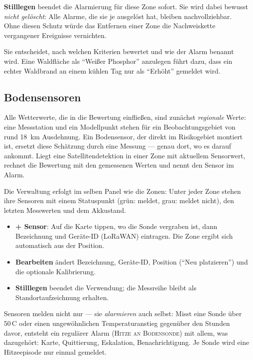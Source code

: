 \documentclass[11pt,a4paper,DIV=12,parskip=half]{scrartcl}
\begin{document}
\textbf{Stilllegen} beendet die Alarmierung für diese Zone sofort. Sie wird
dabei bewusst \emph{nicht gelöscht}: Alle Alarme, die sie je ausgelöst hat,
bleiben nachvollziehbar. Ohne diesen Schutz würde das Entfernen einer Zone die
Nachweiskette vergangener Ereignisse vernichten.

\begin{hinweis}
Sie entscheidet, nach welchen Kriterien bewertet und wie der Alarm benannt
wird. Eine Waldfläche als \enquote{Weißer Phosphor} anzulegen führt dazu, dass
ein echter Waldbrand an einem kühlen Tag nur als \enquote{Erhöht} gemeldet
wird.
\end{hinweis}

\subsection{Bodensensoren}\label{sec:sensoren}

Alle Wetterwerte, die in die Bewertung einfließen, sind zunächst
\emph{regionale} Werte: eine Messstation und ein Modellpunkt stehen für ein
Beobachtungsgebiet von rund 18~km Ausdehnung. Ein Bodensensor, der direkt im
Risikogebiet montiert ist, ersetzt diese Schätzung durch eine Messung ---
genau dort, wo es darauf ankommt. Liegt eine Satellitendetektion in einer
Zone mit aktuellem Sensorwert, rechnet die Bewertung mit den gemessenen
Werten und nennt den Sensor im Alarm.

Die Verwaltung erfolgt im selben Panel wie die Zonen: Unter jeder Zone stehen
ihre Sensoren mit einem Statuspunkt (grün: meldet, grau: meldet nicht), den
letzten Messwerten und dem Akkustand.

\begin{itemize}
  \item \textbf{+ Sensor}: Auf die Karte tippen, wo die Sonde vergraben ist,
        dann Bezeichnung und Geräte-ID (LoRaWAN) eintragen. Die Zone ergibt
        sich automatisch aus der Position.
  \item \textbf{Bearbeiten} ändert Bezeichnung, Geräte-ID, Position
        (\enquote{Neu platzieren}) und die optionale Kalibrierung.
  \item \textbf{Stilllegen} beendet die Verwendung; die Messreihe bleibt als
        Standortaufzeichnung erhalten.
\end{itemize}

Sensoren melden nicht nur --- sie \emph{alarmieren} auch selbst: Misst eine
Sonde über 50\,\textdegree C oder einen ungewöhnlichen Temperaturanstieg
gegenüber den Stunden davor, entsteht ein regulärer Alarm
(\textsc{Hitze an Bodensonde}) mit allem, was dazugehört: Karte, Quittierung,
Eskalation, Benachrichtigung. Je Sonde wird eine Hitzeepisode nur einmal
gemeldet.
\end{document}
